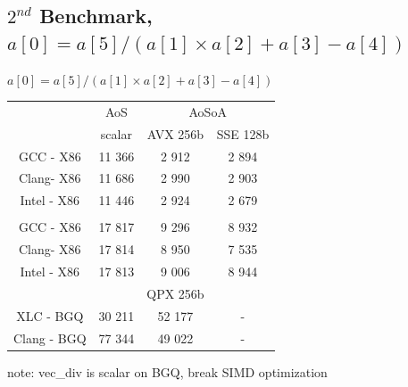 \documentclass{beamer}
\begin{document}
\subsection*{$2^{nd}$ Benchmark, $a[0] = a[5]/(a[1] \times a[2]+a[3]-a[4])$}
\begin{frame}[fragile]
\centering
$\boxed{a[0] = a[5]/(a[1] \times a[2]+a[3]-a[4])}$

\begin{tabular}{ c  c | c c }
\color{C0}{float}           & AoS& \multicolumn{2}{c}{AoSoA}\\
                        & scalar& AVX 256b & SSE 128b\\

                          \hline
   GCC - X86  & 11 366  & 2 912 & \cellcolor{C2}2 894 \\
   Clang- X86  & 11 686  & 2 990 & \cellcolor{C2}2 903 \\
   Intel  - X86   & 11 446 & 2 924 &\cellcolor{C2} 2 679\\
      \hline
        \color{C0}{double}                     &  & & \\
   GCC - X86  & 17 817   & 9 296 & \cellcolor{C2}8 932 \\
   Clang- X86  & 17 814  & 8 950 & \cellcolor{C2}7 535 \\
   Intel  - X86   & 17 813  & 9 006 & \cellcolor{C2}8 944\\
   \hline
 \color{C0}{float}                        &  &  QPX 256b & \\
   XLC - BGQ   &  \cellcolor{C2}30 211 &         52 177 &  - \\
   Clang - BGQ   &  77 344 &         \cellcolor{C2}49 022 &  - \\
\hline

\end{tabular}

\vspace{0.5cm}

note: vec\_div is scalar on BGQ, break SIMD optimization

\end{frame}

\end{document}
